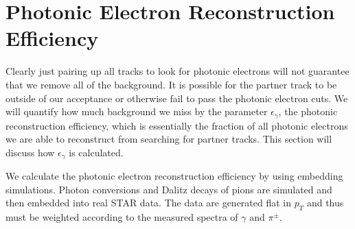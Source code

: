 \section{Photonic Electron Reconstruction Efficiency}

Clearly just pairing up all tracks to look for photonic electrons will not guarantee that we remove all of the background. It is possible for the partner track to be outside of our acceptance or otherwise fail to pass the photonic electron cuts. We will quantify how much background we miss by the parameter $\epsilon_\gamma$, the photonic reconstruction efficiency, which is essentially the fraction of all photonic electrons we are able to reconstruct from searching for partner tracks. This section will discuss how $\epsilon_\gamma$ is calculated.

We calculate the photonic electron reconstruction efficiency by using embedding simulations. Photon conversions and Dalitz decays of pions are simulated and then embedded into real STAR data. The data are generated flat in $p_T$ and thus must be weighted according to the measured spectra of $\gamma$ and $\pi^{\pm}$.
